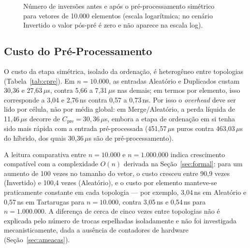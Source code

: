 \documentclass[12pt]{article}
\begin{document}
\begin{figure}[htbp]
\centering
{}
\caption{Número de inversões antes e após o pré-processamento simétrico para vetores de 10.000 elementos (escala logarítmica; no cenário Invertido o valor pós-pré é zero e não aparece na escala log).}
\label{fig:inversoespos}
\end{figure}

\subsection{Custo do Pré-Processamento}\label{sec:custo}

O custo da etapa simétrica, isolado da ordenação, é heterogêneo entre topologias (Tabela~\ref{tab:cpre}). Em $n=10.000$, as entradas Aleatório e Duplicados custam 30,36 e 27,63\,$\mu$s, contra 5,66 a 7,31\,$\mu$s nas demais; em termos por elemento, isso corresponde a 3,04 e 2,76\,ns contra 0,57 a 0,73\,ns. Por isso o \emph{overhead} deve ser lido por célula, não por média global: em Merge/Aleatório, a perda líquida de 11,46\,$\mu$s decorre de $C_{\text{pre}}=30,36\,\mu$s, embora a etapa de ordenação em si tenha sido mais rápida com a entrada pré-processada (451,57\,$\mu$s puros contra 463,03\,$\mu$s do híbrido, dos quais 30,36\,$\mu$s são de pré-processamento).

A leitura comparativa entre $n=10.000$ e $n=1.000.000$ indica crescimento compatível com a complexidade $O(n)$ derivada na Seção~\ref{sec:formal}: para um aumento de 100 vezes no tamanho do vetor, o custo cresceu entre 90,9 vezes (Invertido) e 100,4 vezes (Aleatório), e o custo por elemento manteve-se praticamente constante em cada topologia --- por exemplo, 3,04\,ns em Aleatório e 0,57\,ns em Tartarugas para $n=10.000$, contra 3,05\,ns e 0,54\,ns para $n=1.000.000$. A diferença de cerca de cinco vezes entre topologias não é explicada pelo número de trocas espelhadas isoladamente e não foi investigada mecanisticamente, dada a ausência de contadores de hardware (Seção~\ref{sec:ameacas}).
\end{document}
